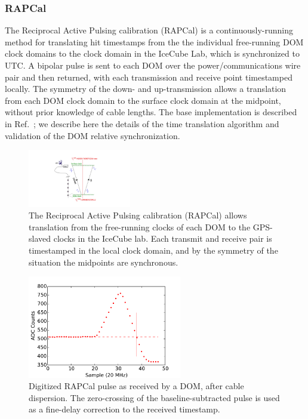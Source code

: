\subsubsection{\label{sect:dom:rapcal}RAPCal}

The Reciprocal Active Pulsing calibration (RAPCal) is a
continuously-running method for translating hit timestamps from the the
individual free-running DOM clock domains to the clock domain in the
IceCube Lab, which is synchronized to UTC.  A bipolar pulse is sent to each
DOM over the power/communications wire pair and then returned, with each
transmission and receive point timestamped locally.  The symmetry of the down-
and up-transmission allows a translation from each DOM clock domain to the
surface clock domain at the midpoint, without prior knowledge of cable lengths.
The base implementation is described in Ref.~\cite{ICECUBE:DAQ}; we
describe here the details of the time translation algorithm and validation
of the DOM relative synchronization. 

\begin{figure}[!h]
 \centering
 \includegraphics[width=0.4\textwidth]{graphics/dom/rapcal/rapcal_symmetry.pdf}
 \caption{The Reciprocal Active Pulsing calibration (RAPCal) allows
   translation from the free-running clocks of each DOM to the GPS-slaved
   clocks in the IceCube lab.  Each transmit and receive pair is
   timestamped in the local clock domain, and by the symmetry of the
   situation the midpoints are synchronous.}
 \label{fig:rapcal_symmetry}
\end{figure}

\begin{figure}[h]
 \centering
 \includegraphics[width=0.6\textwidth]{graphics/dom/rapcal/dom_wf_zero_crossing.pdf}
 \caption{Digitized RAPCal pulse as received by a DOM, after cable dispersion.  The
   zero-crossing of the baseline-subtracted pulse is used as a fine-delay
   correction to the received timestamp.}
 \label{fig:rapcal_zero_crossing}
\end{figure}

